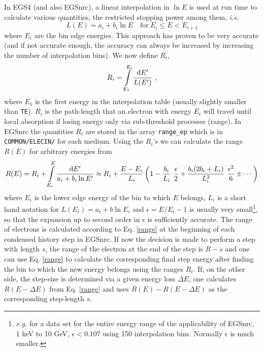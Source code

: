 In EGS4 (and also EGSnrc), a linear interpolation in $\ln E$ is 
used at run time to calculate various quantities, the restricted 
stopping power among them, {\em i.e.}
\begin{equation}
\label{L_interpolation}
L(E) = a_i + b_i \ln E \quad \text{for}~ E_i \le E < E_{i+1}
\end{equation}
where $E_i$ are the bin edge energies. This approach has 
proven to be very accurate (and if not accurate enough, 
the accuracy can always be increased by increasing the 
number of interpolation bins). We now define $R_i$,
\begin{equation}
R_i = \int\limits_{E_1}^{E_i} {{\rm d} E' \over L(E')}~,
\end{equation}
where $E_1$ is the first energy in the interpolation table 
(usually slightly smaller than {\tt TE}). $R_i$ is 
the path-length that an electron with energy $E_i$ will 
travel until local absorption if losing energy only 
via sub-threshold processes (range). 
In EGSnrc the quantities $R_i$ are stored in the array 
{\tt range\_ep} which is in {\tt COMMON/ELECIN/} for each 
medium. Using the $R_i$'s we can calculate the range 
$R(E)$ for arbitrary energies from 
 
\begin{equation}
\label{range}
R(E) = R_i + \int\limits_{E_i}^E {{\rm d}E' \over a_i + b_i \ln E'}  
\approx R_i + {E - E_i \over L_i} \left(1 - 
{b_i \over L_i}~{\epsilon \over 2} + {b_i (2 b_i + L_i) \over L_i^2}~
{\epsilon^2 \over 6} \pm \cdots \right)
\end{equation}
where $E_i$ is the lower edge energy of the bin to which $E$ belongs, 
$L_i$ is a short hand notation for $L(E_i) = a_i + b \ln E_i$ 
and $\epsilon = E/E_i - 1$ is usually very small\footnote{{\em e.g.} for a 
data set for the entire energy range of the applicability 
of EGSnrc, 1 keV to 10 GeV, $\epsilon < 0.107$ using 150 interpolation 
bins. Normally $\epsilon$ is much smaller.}, so that 
the expansion up to second order in $\epsilon$ is sufficiently 
accurate. The range of electrons is calculated according to Eq.  
\eqref{range} at the beginning of each condensed history step in 
EGSnrc. If now the decision is made to perform a step with 
length $s$, the range of the electron at the end of the step 
is $R - s$ and one can use Eq. \eqref{range} to 
calculate the corresponding final step energy after finding 
the bin to which the new energy belongs using the ranges 
$R_i$. If, on the other side, 
the step-size is determined via a given energy loss 
$\Delta E$, one calculates $R(E - \Delta E)$ from 
Eq. \eqref{range} and uses $R(E) - R(E - \Delta E)$  as the 
corresponding step-length $s$. 

